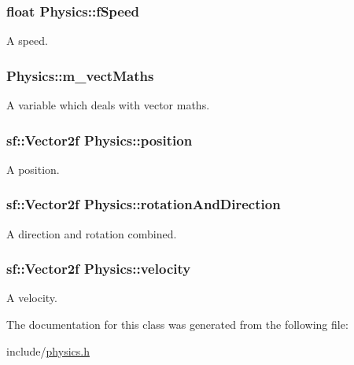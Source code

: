 \subsubsection[{\texorpdfstring{f\+Speed}{fSpeed}}]{\setlength{\rightskip}{0pt plus 5cm}float Physics\+::f\+Speed\hspace{0.3cm}{\ttfamily [private]}}\hypertarget{class_physics_a92809fe4df116f0a8c39ffd0c78ce25d}{}\label{class_physics_a92809fe4df116f0a8c39ffd0c78ce25d}
A speed. 
\subsubsection[{\texorpdfstring{m\+\_\+vect\+Maths}{m_vectMaths}}]{ Physics\+::m\+\_\+vect\+Maths\hspace{0.3cm}{\ttfamily [private]}}\hypertarget{class_physics_a5ef3c448cb1b2c02522b3aa2c3bdc521}{}\label{class_physics_a5ef3c448cb1b2c02522b3aa2c3bdc521}
A variable which deals with vector maths. 
\subsubsection[{\texorpdfstring{position}{position}}]{\setlength{\rightskip}{0pt plus 5cm}sf\+::\+Vector2f Physics\+::position\hspace{0.3cm}{\ttfamily [private]}}\hypertarget{class_physics_a6087213b48f4754b6d69d94f0bc7606c}{}\label{class_physics_a6087213b48f4754b6d69d94f0bc7606c}
A position. 
\subsubsection[{\texorpdfstring{rotation\+And\+Direction}{rotationAndDirection}}]{\setlength{\rightskip}{0pt plus 5cm}sf\+::\+Vector2f Physics\+::rotation\+And\+Direction\hspace{0.3cm}{\ttfamily [private]}}\hypertarget{class_physics_adc767d131b02d48ef12a87f9be293cb8}{}\label{class_physics_adc767d131b02d48ef12a87f9be293cb8}
A direction and rotation combined. 
\subsubsection[{\texorpdfstring{velocity}{velocity}}]{\setlength{\rightskip}{0pt plus 5cm}sf\+::\+Vector2f Physics\+::velocity\hspace{0.3cm}{\ttfamily [private]}}\hypertarget{class_physics_ad8a150e8d89daeb6bcc0d3504b33b47d}{}\label{class_physics_ad8a150e8d89daeb6bcc0d3504b33b47d}
A velocity. 

The documentation for this class was generated from the following file\+:\begin{DoxyCompactItemize}
\item 
include/\hyperlink{physics_8h}{physics.\+h}\end{DoxyCompactItemize}
